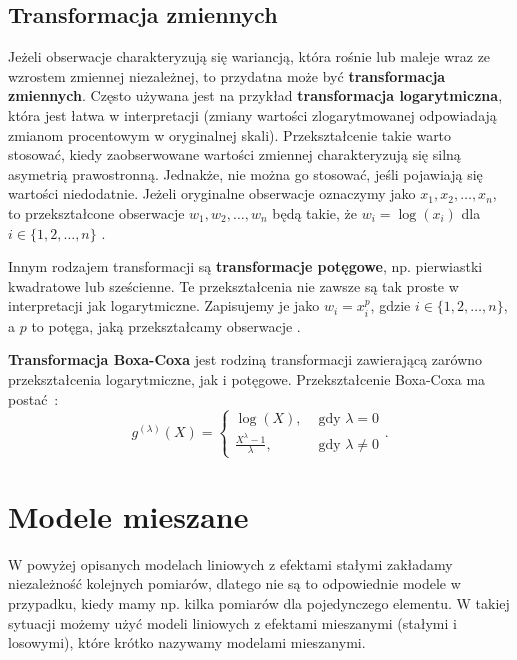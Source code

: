 \documentclass[12pt]{mwbk}
\theoremstyle{plain}
\theoremstyle{definition}
\theoremstyle{definition}
\begin{document}
\subsection{Transformacja zmiennych}

Jeżeli obserwacje charakteryzują się wariancją, która rośnie lub maleje wraz ze wzrostem zmiennej niezależnej, to przydatna może być \textbf{transformacja zmiennych}. Często używana jest na przykład \textbf{transformacja logarytmiczna}, która jest łatwa w interpretacji (zmiany wartości zlogarytmowanej odpowiadają zmianom procentowym w oryginalnej skali). Przekształcenie takie warto stosować, kiedy zaobserwowane wartości zmiennej charakteryzują się silną asymetrią prawostronną. Jednakże, nie można go stosować, jeśli pojawiają się wartości niedodatnie. Jeżeli oryginalne obserwacje oznaczymy jako $x_1, x_2,\ldots, x_n$, to przekształcone obserwacje $w_1, w_2,\ldots,w_n$ będą takie, że $w_i=\log(x_i)$ dla $i \in \lbrace{1,2,\ldots,n\rbrace}$ \cite{forecasting}.

Innym rodzajem transformacji są \textbf{transformacje potęgowe}, np. pierwiastki kwadratowe lub sześcienne. Te przekształcenia nie zawsze są tak proste w interpretacji jak logarytmiczne. Zapisujemy je jako $w_i=x_i^p$, gdzie $i \in \lbrace{1,2,\ldots,n\rbrace}$, a $p$ to potęga, jaką przekształcamy obserwacje \cite{forecasting}.

\textbf{Transformacja Boxa-Coxa} jest rodziną transformacji zawierającą zarówno przekształcenia logarytmiczne, jak i potęgowe. Przekształcenie Boxa-Coxa ma postać~\cite{boxcox}:
$$g^{(\lambda)}(X)=\begin{cases}
\log(X), & \text{ gdy } \lambda=0 \\
\frac{X^{\lambda}-1}{\lambda},&\text{ gdy } \lambda \neq 0
\end{cases}. $$

\section{Modele mieszane} 
W powyżej opisanych modelach liniowych z efektami stałymi zakładamy niezależność kolejnych pomiarów, dlatego nie są to odpowiednie modele w przypadku, kiedy mamy np. kilka pomiarów dla pojedynczego elementu. W takiej sytuacji możemy użyć modeli liniowych z efektami mieszanymi (stałymi i losowymi), które krótko nazywamy modelami mieszanymi.
\end{document}
